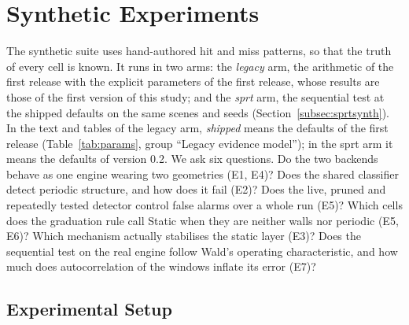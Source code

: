 \section{Synthetic Experiments}\label{sec:exp}

The synthetic suite uses hand-authored hit and miss patterns, so that the truth of every cell is known. It runs in two arms: the \emph{legacy} arm, the arithmetic of the first release with the explicit parameters of the first release, whose results are those of the first version of this study; and the \emph{sprt} arm, the sequential test at the shipped defaults on the same scenes and seeds (Section~\ref{subsec:sprtsynth}). In the text and tables of the legacy arm, \emph{shipped} means the defaults of the first release (Table~\ref{tab:params}, group ``Legacy evidence model''); in the sprt arm it means the defaults of version 0.2. We ask six questions. Do the two backends behave as one engine wearing two geometries (E1, E4)? Does the shared classifier detect periodic structure, and how does it fail (E2)? Does the live, pruned and repeatedly tested detector control false alarms over a whole run (E5)? Which cells does the graduation rule call Static when they are neither walls nor periodic (E5, E6)? Which mechanism actually stabilises the static layer (E3)? Does the sequential test on the real engine follow Wald's operating characteristic, and how much does autocorrelation of the windows inflate its error (E7)?

\subsection{Experimental Setup}\label{subsec:setup}

